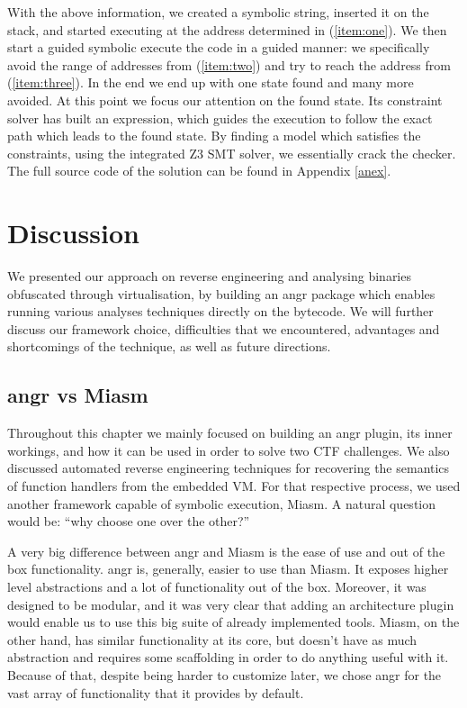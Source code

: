 With the above information, we created a symbolic string, inserted it on the stack, and started executing at the address determined in (\ref{item:one}). We then start a guided symbolic execute the code in a guided manner: we specifically avoid the range of addresses from (\ref{item:two}) and try to reach the address from (\ref{item:three}). In the end we end up with one state found and many more avoided. At this point we focus our attention on the found state. Its constraint solver has built an expression, which guides the execution to follow the exact path which leads to the found state. By finding a model which satisfies the constraints, using the integrated Z3 \cite{z3} \gls{SMT} solver, we essentially crack the checker. The full source code of the solution can be found in Appendix \ref{anex}.

\section{Discussion}

We presented our approach on reverse engineering and analysing binaries obfuscated through virtualisation, by building an angr package which enables running various analyses techniques directly on the bytecode. We will further discuss our framework choice, difficulties that we encountered, advantages and shortcomings of the technique, as well as future directions.

\subsection{angr vs Miasm}

Throughout this chapter we mainly focused on building an angr plugin, its inner workings, and how it can be used in order to solve two \gls{CTF} challenges. We also discussed automated reverse engineering techniques for recovering the semantics of function handlers from the embedded \gls{VM}. For that respective process, we used another framework capable of symbolic execution, Miasm. A natural question would be: ``why choose one over the other?'' 

A very big difference between angr and Miasm is the ease of use and out of the box functionality. angr is, generally, easier to use than Miasm. It exposes higher level abstractions and a lot of functionality out of the box. Moreover, it was designed to be modular, and it was very clear that adding an architecture plugin would enable us to use this big suite of already implemented tools. Miasm, on the other hand, has similar functionality at its core, but doesn't have as much abstraction and requires some scaffolding in order to do anything useful with it. Because of that, despite being harder to customize later, we chose angr for the vast array of functionality that it provides by default.

